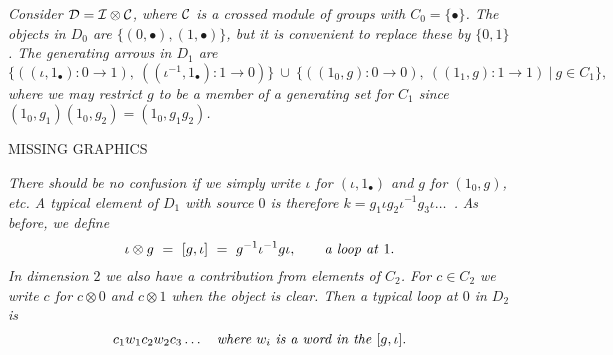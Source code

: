 \medskip
\begin{example}
\emph{Consider $\mathcal{D} = \mathcal{I}\otimes\mathcal{C}$, where $\mathcal{C}$ is a crossed module 
of groups with $C_0=\{\bullet\}$. 
The objects in $D_0$ are $\{(0,\bullet),(1,\bullet)\}$, 
but it is convenient to replace these by $\{0,1\}$. 
The generating arrows in $D_1$ are}
$$
\{ ((\iota,1_{\bullet}) : 0 \to 1),~ ((\iota^{-1},1_{\bullet}) : 1 \to 0)\} 
~\cup~
\{((1_0,g) : 0 \to 0),~ ((1_1,g) : 1 \to 1) ~|~ g \in C_1 \}, 
$$
\emph{where we may restrict $g$ to be a member of a generating set for $C_1$ 
since $(1_0,g_1)(1_0,g_2) = (1_0,g_1g_2)$.} 
\begin{center}
MISSING GRAPHICS
\end{center}
\emph{There should be no confusion if we simply write $\iota$ for 
$(\iota,1_{\bullet})$ and $g$ for $(1_0,g)$, etc. 
A typical element of $D_1$ with source $0$ is therefore 
$k = g_1 \iota g_2 \iota^{-1} g_3 \iota \ldots$~.}
\emph{As before, we define} 
$$
\iota \otimes g ~=~ [g,\iota] ~=~ g^{-1}\iota^{-1}g\iota, 
\qquad\text{\emph{a loop at}}~ 1. 
$$
\emph{In dimension $2$ we also have a contribution from elements of $C_2$. 
For $c \in C_2$ we write $c$ for $c \otimes 0$ and $c \otimes 1$ 
when the object is clear. 
Then a typical loop at $0$ in $D_2$ is} 
$$
c_1 w_1 c_2 w_2 c_3 \ldots 
\quad\text{\emph{where}}~ w_i ~\text{\emph{is a word in the}}~ [g,\iota]. 
$$
\end{example}

